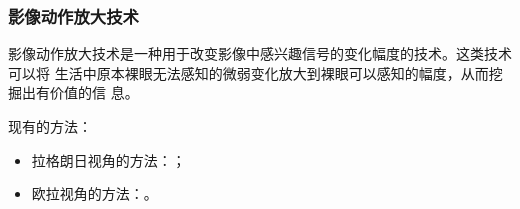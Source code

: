 \documentclass[xcolor=svgnames,serif,table]{beamer}
\begin{document}
\begin{frame}[t]
\begin{center}
{}
  \end{center}
\end{frame}

\begin{frame}
  \frametitle{影像动作放大技术}
  影像动作放大技术是一种用于改变影像中感兴趣信号的变化幅度的技术。这类技术可以将
  生活中原本裸眼无法感知的微弱变化放大到裸眼可以感知的幅度，从而挖掘出有价值的信
  息。

  \medskip

  现有的方法：
  \begin{itemize}
  \item 拉格朗日视角的方法：\cite{liu2005motion}；
  \item 欧拉视角的方法：\cite{wu2012eulerian, Wadhwa2013PhaseBased}。
  \end{itemize}
\end{frame}
\end{document}
